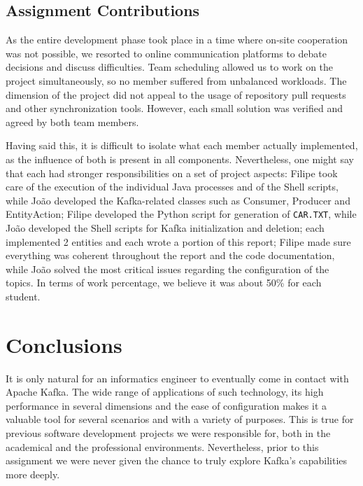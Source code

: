 \documentclass[12pt]{article}
\begin{document}
\subsection{Assignment Contributions} %

As the entire development phase took place in a time where on-site cooperation was not possible, we resorted to online communication platforms to debate decisions
and discuss difficulties.
Team scheduling allowed us to work on the project simultaneously, so no member suffered from unbalanced workloads.
The dimension of the project did not appeal to the usage of repository pull requests and other synchronization tools.
However, each small solution was verified and agreed by both team members.

Having said this, it is difficult to isolate what each member actually implemented, as the influence of both is present in all components.
Nevertheless, one might say that each had stronger responsibilities on a set of project aspects:
Filipe took care of the execution of the individual Java processes and of the Shell scripts, while João developed the Kafka-related classes such as Consumer,
Producer and EntityAction; Filipe developed the Python script for generation of \texttt{CAR.TXT}, while João developed the Shell scripts for Kafka initialization 
and deletion; each implemented 2 entities and each wrote a portion of this report; Filipe made sure everything was coherent throughout the report and the code 
documentation, while João solved the most critical issues regarding the configuration of the topics.
In terms of work percentage, we believe it was about 50\% for each student.

\newpage
\section*{Conclusions} %

It is only natural for an informatics engineer to eventually come in contact with Apache Kafka.
The wide range of applications of such technology, its high performance in several dimensions and the ease of configuration makes it a valuable tool for several
scenarios and with a variety of purposes.
This is true for previous software development projects we were responsible for, both in the academical and the professional environments.
Nevertheless, prior to this assignment we were never given the chance to truly explore Kafka's capabilities more deeply.
\end{document}
